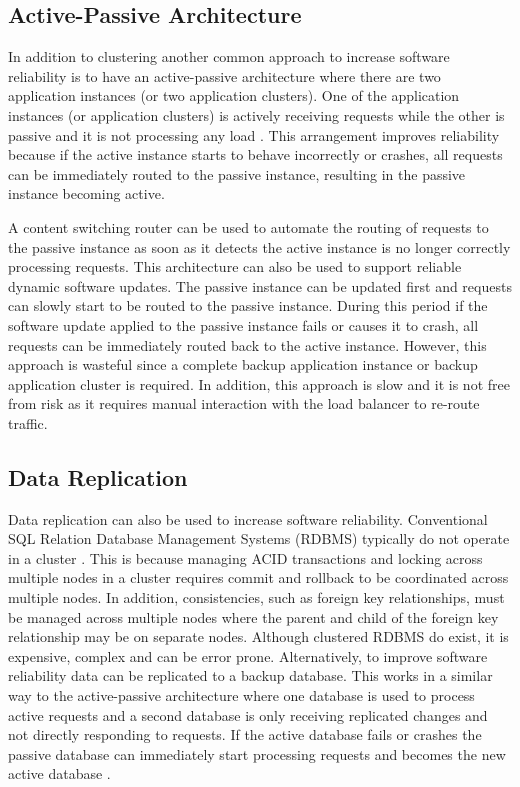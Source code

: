 \documentclass[a4paper,11pt,twoside]{report}
\begin{document}
\subsection{Active-Passive Architecture}
In addition to clustering another common approach to increase software reliability is to have an active-passive architecture where there are two application instances  (or two application clusters). One of the application instances (or application clusters) is actively receiving requests while the other is passive and it is not processing any load \cite{active_passive}. This arrangement improves reliability because if the active instance starts to behave incorrectly or crashes, all requests can be immediately routed to the passive instance, resulting in the passive instance becoming active. 

A content switching router can be used to automate the routing of requests to the passive instance as soon as it detects the active instance is no longer correctly processing requests. This architecture can also be used to support reliable dynamic software updates. The passive instance can be updated first and requests can slowly start to be routed to the passive instance. During this period if the software update applied to the passive instance fails or causes it to crash, all requests can be immediately routed back to the active instance. However, this approach is wasteful since a complete backup application instance or backup application cluster is required. In addition, this approach is slow and it is not free from risk as it requires manual interaction with the load balancer to re-route traffic.

\subsection{Data Replication}
Data replication can also be used to increase software reliability. Conventional SQL Relation Database Management Systems (RDBMS) typically do not operate in a cluster \cite{Replication}. This is because managing ACID transactions and locking across multiple nodes in a cluster requires commit and rollback to be coordinated across multiple nodes. In addition, consistencies, such as foreign key relationships, must be managed across multiple nodes where the parent and child of the foreign key relationship may be on separate nodes. Although clustered RDBMS do exist, it is expensive, complex and can be error prone. Alternatively, to improve software reliability data can be replicated to a backup database. This works in a similar way to the active-passive architecture where one database is used to process active requests and a second database is only receiving replicated changes and not directly responding to requests. If the active database fails or crashes the passive database can immediately start processing requests and becomes the new active database  \cite{Replication}.
\end{document}
